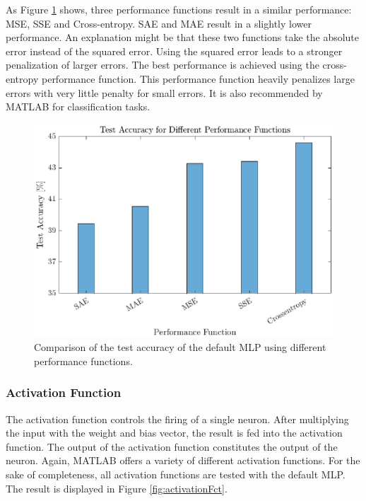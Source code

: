  As Figure \ref{fig:performFct} shows, three performance functions result in a similar performance: MSE, SSE and Cross-entropy. SAE and MAE result in a slightly lower performance. An explanation might be that these two functions take the absolute error instead of the squared error. Using the squared error leads to a stronger penalization of larger errors. The best performance is achieved using the cross-entropy performance function. This performance function heavily penalizes large errors with very little penalty for small errors. It is also recommended by MATLAB for classification tasks.

 \begin{figure}[h!]
 	\centering
 	\includegraphics{images/performFct}
 	\caption{Comparison of the test accuracy of the default MLP using different performance functions.}
 	\label{fig:performFct}
 \end{figure}

 \subsubsection{Activation Function}

 The activation function controls the firing of a single neuron. After multiplying the input with the weight and bias vector, the result is fed into the activation function. The output of the activation function constitutes the output of the neuron. Again, MATLAB offers a variety of different activation functions. For the sake of completeness, all activation functions are tested with the default MLP. The result is displayed in Figure \ref{fig:activationFct}.

